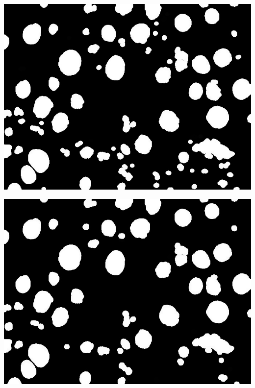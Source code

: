 \documentclass[a4paper]{article}
\begin{document}
\begin{minipage}{0.24\textwidth}
    \centering
    \includegraphics[width=\textwidth]{../code/task1/output/kernel_size_13.jpg}
\end{minipage}
\hfill
\begin{minipage}{0.24\textwidth}
    \centering
    \includegraphics[width=\textwidth]{../code/task1/output/kernel_size_15.jpg}
\end{minipage}
\end{document}
